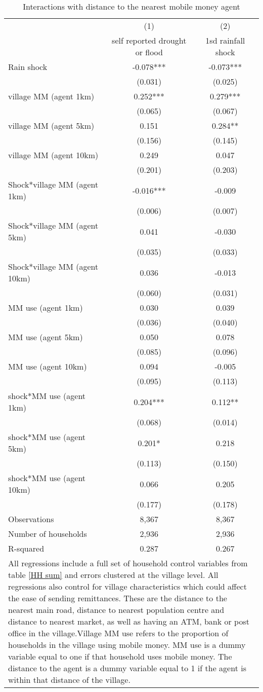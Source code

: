 \begin{table}
\centering \caption{Interactions with distance to the nearest mobile money agent} \label{distance}
\def\arraystretch{0.80}
\begin{tabular}{lcc} \hline
 & (1) & (2) \\
 & self reported drought or flood & 1sd rainfall shock \\ \hline
Rain shock & -0.078*** & -0.073*** \\
& (0.031) & (0.025) \\
village MM (agent 1km) & 0.252*** & 0.279*** \\
 & (0.065) & (0.067) \\
village MM (agent 5km) & 0.151 & 0.284**  \\
  & (0.156)  & (0.145) \\
village MM (agent 10km) & 0.249 & 0.047 \\
 & (0.201) & (0.203) \\
Shock*village MM (agent 1km)  & -0.016*** &  -0.009 \\
 & (0.006) &  (0.007)  \\
Shock*village MM (agent 5km) & 0.041 & -0.030 \\
 & (0.035) & (0.033)  \\
Shock*village MM (agent 10km)  & 0.036 & -0.013 \\
 & (0.060) &  (0.031) \\
MM use (agent 1km)  & 0.030 & 0.039 \\
 & (0.036) & (0.040) \\
MM use (agent 5km) & 0.050 &  0.078  \\
 & (0.085) &  (0.096)  \\
MM use (agent 10km)  & 0.094 & -0.005 \\
 & (0.095) & (0.113) \\
shock*MM use (agent 1km) & 0.204*** &  0.112**  \\
 & (0.068) &  (0.014) \\
shock*MM use (agent 5km) & 0.201* & 0.218 \\
 & (0.113) & (0.150) \\
shock*MM use (agent 10km) & 0.066 &  0.205   \\
 & (0.177) &  (0.178) \\
Observations & 8,367 & 8,367 \\
Number of households & 2,936 & 2,936 \\
R-squared & 0.287 & 0.267 \\
  \hline
\multicolumn{3}{p{14cm}}{All regressions include a full set of household control variables from table \ref{HH sum} and errors clustered at the village level.  All regressions also control for village characteristics which could affect the ease of sending remittances. These are the distance to the nearest main road, distance to nearest population centre and distance to nearest market, as well as having an ATM, bank or post office in the village.Village MM use refers to the proportion of households in the village using mobile money. MM use is a dummy variable equal to one if that household uses mobile money. The distance to the agent is a dummy variable equal to 1 if the agent is within that distance of the village.} \\

\end{tabular}
\end{table}
